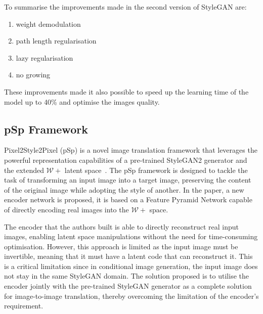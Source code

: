 \noindent To summarise the improvements made in the second version of StyleGAN are:
\begin{enumerate}
\setlength{\itemsep}{1pt}
\setlength{\parskip}{0pt}
\setlength{\parsep}{0pt}
    \item weight demodulation
    \item path length regularisation
    \item lazy regularisation
    \item no growing
\end{enumerate}
These improvements made it also possible to speed up the learning time of the model up to \num{40}\% and optimise the images quality.

\subsection{pSp Framework}
\label{section:pspFramework}
Pixel2Style2Pixel (pSp) is a novel image translation framework that leverages the powerful representation capabilities of a pre-trained StyleGAN2 generator and the extended $\mathcal{W}+$ latent space~\cite{pSp}. The pSp framework is designed to tackle the task of transforming an input image into a target image, preserving the content of the original image while adopting the style of another.
In the paper, a new encoder network is proposed, it is based on a Feature Pyramid Network capable of directly encoding real images into the $\mathcal{W}+$ space.

\noindent The encoder that the authors built is able to directly reconstruct real input images, enabling latent space manipulations without the need for time-consuming optimisation. However, this approach is limited as the input image must be invertible, meaning that it must have a latent code that can reconstruct it. This is a critical limitation since in conditional image generation, the input image does not stay in the same StyleGAN domain. The solution proposed is to utilise the encoder jointly with the pre-trained StyleGAN generator as a complete solution for image-to-image translation, thereby overcoming the limitation of the encoder's requirement. 

